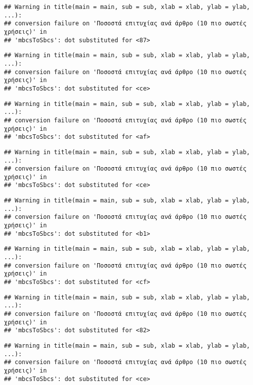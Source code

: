 \documentclass[
]{article}
\begin{document}
\begin{verbatim}
## Warning in title(main = main, sub = sub, xlab = xlab, ylab = ylab, ...):
## conversion failure on 'Ποσοστά επιτυχίας ανά άρθρο (10 πιο σωστές χρήσεις)' in
## 'mbcsToSbcs': dot substituted for <87>
\end{verbatim}

\begin{verbatim}
## Warning in title(main = main, sub = sub, xlab = xlab, ylab = ylab, ...):
## conversion failure on 'Ποσοστά επιτυχίας ανά άρθρο (10 πιο σωστές χρήσεις)' in
## 'mbcsToSbcs': dot substituted for <ce>
\end{verbatim}

\begin{verbatim}
## Warning in title(main = main, sub = sub, xlab = xlab, ylab = ylab, ...):
## conversion failure on 'Ποσοστά επιτυχίας ανά άρθρο (10 πιο σωστές χρήσεις)' in
## 'mbcsToSbcs': dot substituted for <af>
\end{verbatim}

\begin{verbatim}
## Warning in title(main = main, sub = sub, xlab = xlab, ylab = ylab, ...):
## conversion failure on 'Ποσοστά επιτυχίας ανά άρθρο (10 πιο σωστές χρήσεις)' in
## 'mbcsToSbcs': dot substituted for <ce>
\end{verbatim}

\begin{verbatim}
## Warning in title(main = main, sub = sub, xlab = xlab, ylab = ylab, ...):
## conversion failure on 'Ποσοστά επιτυχίας ανά άρθρο (10 πιο σωστές χρήσεις)' in
## 'mbcsToSbcs': dot substituted for <b1>
\end{verbatim}

\begin{verbatim}
## Warning in title(main = main, sub = sub, xlab = xlab, ylab = ylab, ...):
## conversion failure on 'Ποσοστά επιτυχίας ανά άρθρο (10 πιο σωστές χρήσεις)' in
## 'mbcsToSbcs': dot substituted for <cf>
\end{verbatim}

\begin{verbatim}
## Warning in title(main = main, sub = sub, xlab = xlab, ylab = ylab, ...):
## conversion failure on 'Ποσοστά επιτυχίας ανά άρθρο (10 πιο σωστές χρήσεις)' in
## 'mbcsToSbcs': dot substituted for <82>
\end{verbatim}

\begin{verbatim}
## Warning in title(main = main, sub = sub, xlab = xlab, ylab = ylab, ...):
## conversion failure on 'Ποσοστά επιτυχίας ανά άρθρο (10 πιο σωστές χρήσεις)' in
## 'mbcsToSbcs': dot substituted for <ce>
\end{verbatim}
\end{document}
